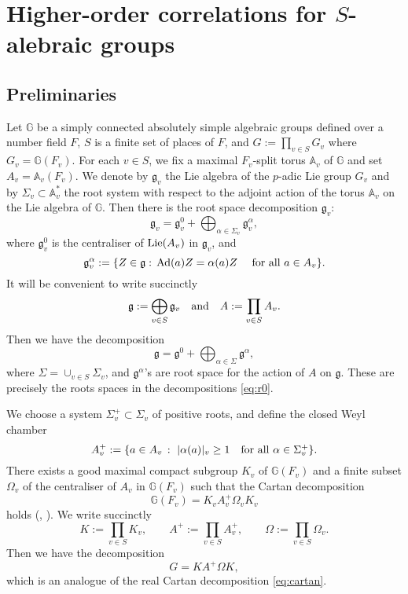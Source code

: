 \documentclass[11pt,reqno,a4paper]{amsart}
\numberwithin{equation}{section}
\newcommand{\bA}{\mathbb{A}}
\newcommand{\bG}{\mathbb{G}}
\newcommand{\gog}{\mathfrak{g}}
\DeclareMathOperator{\Ad}{Ad}
\theoremstyle{theorem}
\theoremstyle{definition}
\begin{document}
\section{Higher-order correlations for $S$-alebraic groups}
\label{sec:salg}

\subsection{Preliminaries}

Let $\bG$ be a simply connected absolutely simple algebraic groups
defined over a number field $F$, $S$ is a finite set of places of $F$,
and $G:=\prod_{v\in S} G_v$ where $G_v=\bG(F_v)$. 
For each $v\in S$, we fix a maximal $F_v$-split torus
$\bA_v$ of $\bG$ and set $A_v=\bA_v(F_v)$. We denote by $\gog_v$ the Lie algebra of the $p$-adic
Lie group $G_v$ and by $\Sigma_v\subset \bA^*_v$
the root system with respect to the adjoint action of the torus $\bA_v$ on the Lie algebra of $\bG$.
Then there is the root space decomposition $\gog_v$:
\begin{equation}
\label{eq:r0}
\gog_v=\gog_v^0+\bigoplus_{\alpha\in \Sigma_v} \gog_v^\alpha,
\end{equation}
where $\gog_v^0$ is the centraliser of $\hbox{Lie}(A_v)$ in $\gog_v$, and 
$$
\gog_v^\alpha:=\{Z\in \gog:\, \Ad(a)Z=\alpha(a)Z\quad\hbox{ for all $a\in A_v$}\}.
$$
It will be convenient to write succinctly 
$$
\gog:=\bigoplus_{v\in S} \gog_v\quad\hbox{and}\quad A:=\prod_{v\in S} A_v.
$$
Then we have the decomposition
\begin{equation}
\label{eq:ggg0}
\gog=\gog^0+\bigoplus_{\alpha\in \Sigma} \gog^\alpha,
\end{equation}
where $\Sigma=\cup_{v\in S} \Sigma_v$, and $\gog^\alpha$'s are root space for the action of $A$ on $\gog$.
These are precisely the roots spaces in the decompositions \eqref{eq:r0}.

We choose a system $\Sigma_v^+\subset \Sigma_v$ of positive roots,
and define the closed Weyl chamber
$$
A_v^+:=\{a\in A_v\,:\,\, |\alpha(a)|_v\ge 1 \quad\hbox{for all $\alpha\in \Sigma_v^+$}\}.
$$
There exists a good maximal compact subgroup
$K_v$ of $\bG(F_v)$ and a finite subset $\Omega_v$ of the centraliser
of $A_v$ in $\bG(F_v)$ such that the Cartan decomposition
\begin{equation}
\label{eq:cartan_padic}
\bG(F_v)=K_v A_v^+ \Omega_v K_v
\end{equation}
holds (\cite{BT}, \cite{Ti}). We write succinctly 
$$
K:=\prod_{v\in S} K_v,\quad\quad A^+:=\prod_{v\in S} A^+_v,\quad\quad \Omega:=\prod_{v\in S} \Omega_v.
$$
Then we have the decomposition
$$
G=KA^+\Omega K,
$$
which is an analogue of the real Cartan decomposition \eqref{eq:cartan}.
\end{document}
